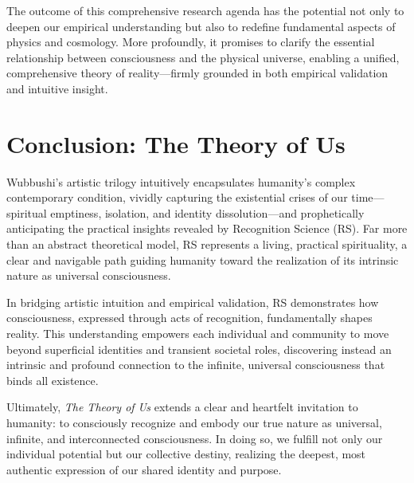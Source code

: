 \documentclass[12pt]{article}
\begin{document}
The outcome of this comprehensive research agenda has the potential not only to deepen our empirical understanding but also to redefine fundamental aspects of physics and cosmology. More profoundly, it promises to clarify the essential relationship between consciousness and the physical universe, enabling a unified, comprehensive theory of reality—firmly grounded in both empirical validation and intuitive insight.

\section*{Conclusion: The Theory of Us}

Wubbushi’s artistic trilogy intuitively encapsulates humanity’s complex contemporary condition, vividly capturing the existential crises of our time—spiritual emptiness, isolation, and identity dissolution—and prophetically anticipating the practical insights revealed by Recognition Science (RS). Far more than an abstract theoretical model, RS represents a living, practical spirituality, a clear and navigable path guiding humanity toward the realization of its intrinsic nature as universal consciousness.

In bridging artistic intuition and empirical validation, RS demonstrates how consciousness, expressed through acts of recognition, fundamentally shapes reality. This understanding empowers each individual and community to move beyond superficial identities and transient societal roles, discovering instead an intrinsic and profound connection to the infinite, universal consciousness that binds all existence.

Ultimately, \textit{The Theory of Us} extends a clear and heartfelt invitation to humanity: to consciously recognize and embody our true nature as universal, infinite, and interconnected consciousness. In doing so, we fulfill not only our individual potential but our collective destiny, realizing the deepest, most authentic expression of our shared identity and purpose.
\end{document}
